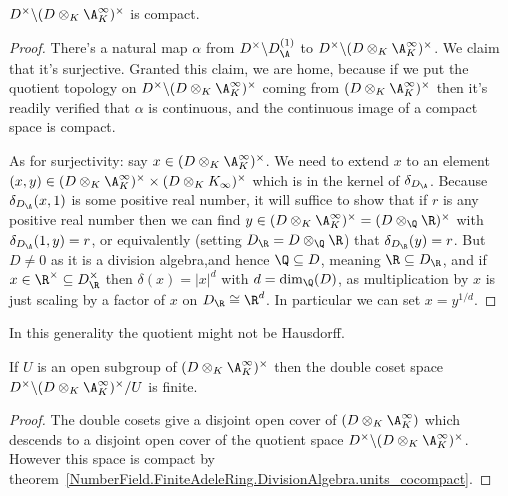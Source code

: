 \begin{theorem}
  \label{NumberField.FiniteAdeleRing.DivisionAlgebra.units_cocompact}
  \leanok
  $D^\times\backslash(D\otimes_K\A_K^\infty)^\times$ is compact.
\end{theorem}
\begin{proof}
  \leanok
There's a natural map $\alpha$ from $D^\times\backslash D_{\A}^{(1)}$ to
  $D^\times\backslash (D\otimes_K \A_K^\infty)^\times$. We claim that it's
  surjective. Granted this claim, we are home, because if we put the quotient
  topology on $D^\times\backslash (D\otimes_K \A_K^\infty)^\times$ coming from
  $(D\otimes_K \A_K^\infty)^\times$ then it's readily verified that $\alpha$
  is continuous, and the continuous image of a compact space is compact.

  As for surjectivity: say $x\in (D\otimes_K \A_K^\infty)^\times$. We need to extend
  $x$ to an element $(x,y)\in (D\otimes_K \A_K^\infty)^\times\times(D\otimes_K K_\infty)^\times$
  which is in the kernel of $\delta_{D_{\A}}$. Because $\delta_{D_{\A}}(x,1)$ is some positive
  real number, it will suffice to show that if $r$ is any positive real number then we can
  find $y\in (D\otimes_K \A_K^\infty)^\times=(D\otimes_{\Q}\R)^\times$ with $\delta_{D_{\A}}(1,y)=r$,
  or equivalently (setting $D_{\R}=D\otimes_{\Q}\R$) that $\delta_{D_{\R}}(y)=r$.
  But $D\not=0$ as it is a division algebra,and hence $\Q\subseteq D$, meaning
  $\R\subseteq D_{\R}$, and if
  $x\in\R^\times\subseteq D_{\R}^\times$ then $\delta(x)=|x|^d$ with $d=\dim_{\Q}(D)$,
  as multiplication by $x$ is just scaling by a factor of $x$ on $D_{\R}\cong\R^d$.
  In particular we can set $x=y^{1/d}$.
\end{proof}

\begin{remark} In this generality the quotient might not be Hausdorff.
\end{remark}

\begin{theorem}
  \label{NumberField.FiniteAdeleRing.DivisionAlgebra.finiteDoubleCoset}
  \leanok
  If $U$ is an open subgroup of $(D\otimes_K \A_K^\infty)^\times$
  then the double coset space $D^\times\backslash(D\otimes_K \A_K^\infty)^\times/U$ is finite.
\end{theorem}
\begin{proof}
  \leanok
  The double cosets give a disjoint open cover of $(D\otimes_K \A_K^\infty)$
  which descends to a disjoint open cover of the quotient space
  $D^\times\backslash(D\otimes_K \A_K^\infty)^\times$. However this space is compact
  by theorem~\ref{NumberField.FiniteAdeleRing.DivisionAlgebra.units_cocompact}.
\end{proof}
